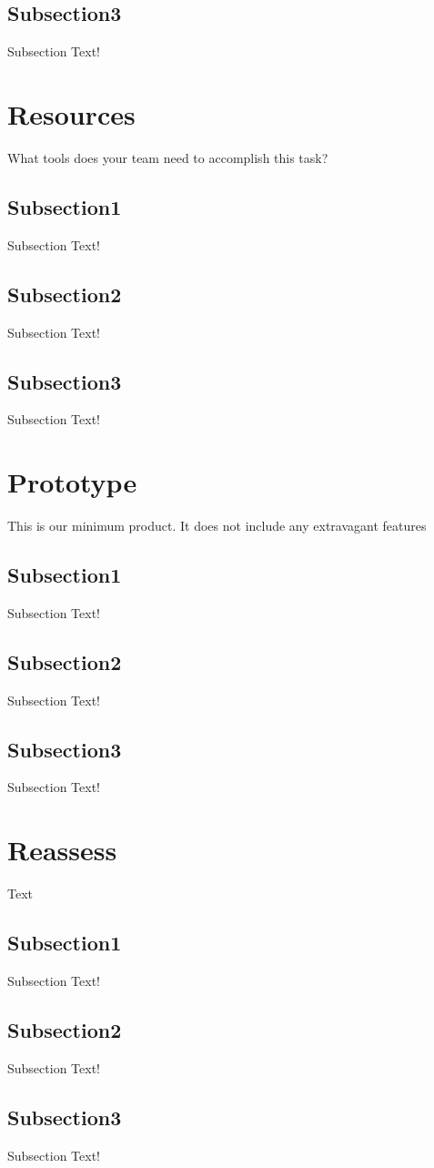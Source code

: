 \documentclass[12pt,journal,compsoc]{IEEEtran}
\begin{document}
    \subsection{Subsection3}Subsection Text!
\section{Resources} What tools does your team need to accomplish this task? 
    \subsection{Subsection1}Subsection Text!
    \subsection{Subsection2}Subsection Text!
    \subsection{Subsection3}Subsection Text!
\section{Prototype} This is our minimum product. It does not include any extravagant features
    \subsection{Subsection1}Subsection Text!
    \subsection{Subsection2}Subsection Text!
    \subsection{Subsection3}Subsection Text!
\section{Reassess} Text
    \subsection{Subsection1}Subsection Text!
    \subsection{Subsection2}Subsection Text!
    \subsection{Subsection3}Subsection Text!
\end{document}
